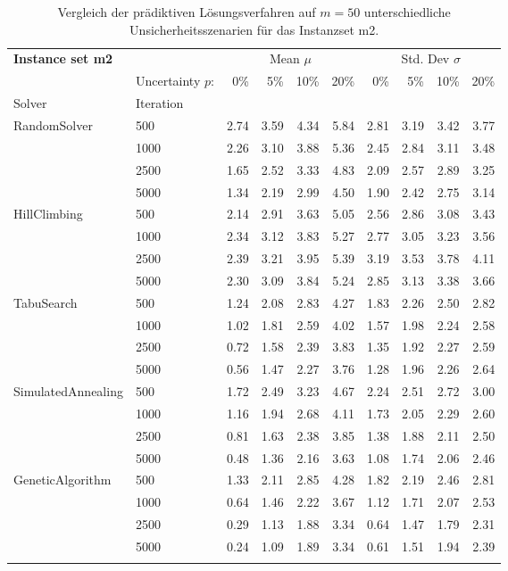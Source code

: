 {\footnotesize
\begin{longtable}{ll|rrrr|rrrr}
\toprule
\textbf{Instance set m2}                 & {} & \multicolumn{4}{c|}{Mean $\mu$} & \multicolumn{4}{c}{Std. Dev $\sigma$} \\
                & Uncertainty $p$: & 0\% & 5\% & 10\% & 20\% & 0\% & 5\% & 10\% & 20\% \\
Solver & Iteration &      &      &      &      &      &      &      &      \\
\midrule
RandomSolver & 500  & 2.74 & 3.59 & 4.34 & 5.84 & 2.81 & 3.19 & 3.42 & 3.77 \\
                 & 1000 & 2.26 & 3.10 & 3.88 & 5.36 & 2.45 & 2.84 & 3.11 & 3.48 \\
                 & 2500 & 1.65 & 2.52 & 3.33 & 4.83 & 2.09 & 2.57 & 2.89 & 3.25 \\
                 & 5000 & 1.34 & 2.19 & 2.99 & 4.50 & 1.90 & 2.42 & 2.75 & 3.14 \\ \hline
HillClimbing & 500  & 2.14 & 2.91 & 3.63 & 5.05 & 2.56 & 2.86 & 3.08 & 3.43 \\
                 & 1000 & 2.34 & 3.12 & 3.83 & 5.27 & 2.77 & 3.05 & 3.23 & 3.56 \\
                 & 2500 & 2.39 & 3.21 & 3.95 & 5.39 & 3.19 & 3.53 & 3.78 & 4.11 \\
                 & 5000 & 2.30 & 3.09 & 3.84 & 5.24 & 2.85 & 3.13 & 3.38 & 3.66 \\ \hline
TabuSearch & 500  & 1.24 & 2.08 & 2.83 & 4.27 & 1.83 & 2.26 & 2.50 & 2.82 \\
                 & 1000 & 1.02 & 1.81 & 2.59 & 4.02 & 1.57 & 1.98 & 2.24 & 2.58 \\
                 & 2500 & 0.72 & 1.58 & 2.39 & 3.83 & 1.35 & 1.92 & 2.27 & 2.59 \\
                 & 5000 & 0.56 & 1.47 & 2.27 & 3.76 & 1.28 & 1.96 & 2.26 & 2.64 \\ \hline
SimulatedAnnealing & 500  & 1.72 & 2.49 & 3.23 & 4.67 & 2.24 & 2.51 & 2.72 & 3.00 \\
                 & 1000 & 1.16 & 1.94 & 2.68 & 4.11 & 1.73 & 2.05 & 2.29 & 2.60 \\
                 & 2500 & 0.81 & 1.63 & 2.38 & 3.85 & 1.38 & 1.88 & 2.11 & 2.50 \\
                 & 5000 & 0.48 & 1.36 & 2.16 & 3.63 & 1.08 & 1.74 & 2.06 & 2.46 \\ \hline
GeneticAlgorithm & 500  & 1.33 & 2.11 & 2.85 & 4.28 & 1.82 & 2.19 & 2.46 & 2.81 \\
                 & 1000 & 0.64 & 1.46 & 2.22 & 3.67 & 1.12 & 1.71 & 2.07 & 2.53 \\
                 & 2500 & 0.29 & 1.13 & 1.88 & 3.34 & 0.64 & 1.47 & 1.79 & 2.31 \\
                 & 5000 & 0.24 & 1.09 & 1.89 & 3.34 & 0.61 & 1.51 & 1.94 & 2.39 \\
\bottomrule
\caption{Vergleich der prädiktiven Lösungsverfahren auf $m=50$ unterschiedliche Unsicherheitsszenarien für das Instanzset m2. }
\label{tab:evaluation_predictive_m2}
\end{longtable}
}
